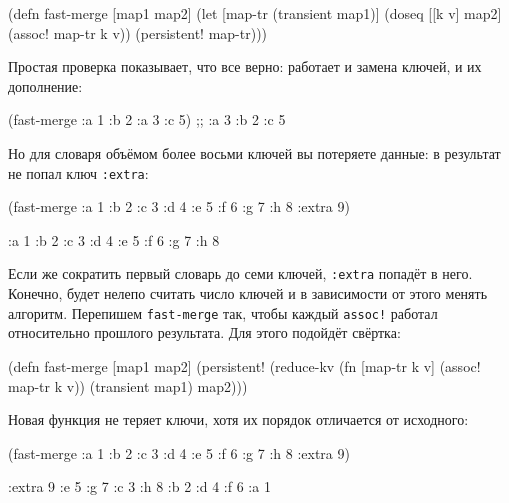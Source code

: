 \begin{english}
  \begin{clojure}
(defn fast-merge [map1 map2]
  (let [map-tr (transient map1)]
    (doseq [[k v] map2]
      (assoc! map-tr k v))
    (persistent! map-tr)))
  \end{clojure}
\end{english}

Простая проверка показывает, что все верно: работает и замена ключей, и их
дополнение:

\begin{english}
  \begin{clojure}
(fast-merge {:a 1 :b 2} {:a 3 :c 5})
;; {:a 3 :b 2 :c 5}
  \end{clojure}
\end{english}

Но для словаря объёмом более восьми ключей вы потеряете данные: в результат не
попал ключ \verb|:extra|:

\begin{english}
  \begin{clojure}
(fast-merge
 {:a 1 :b 2 :c 3 :d 4
  :e 5 :f 6 :g 7 :h 8}
 {:extra 9})

{:a 1 :b 2 :c 3 :d 4
 :e 5 :f 6 :g 7 :h 8}
  \end{clojure}
\end{english}

Если же сократить первый словарь до семи ключей, \verb|:extra| попадёт в
него. Конечно, будет нелепо считать число ключей и в зависимости от этого менять
алгоритм. Перепишем \verb|fast-merge| так, чтобы каждый \verb|assoc!| работал
относительно прошлого результата. Для этого подойдёт свёртка:

\begin{english}
  \begin{clojure}
(defn fast-merge [map1 map2]
  (persistent!
   (reduce-kv
    (fn [map-tr k v]
      (assoc! map-tr k v))
    (transient map1)
    map2)))
  \end{clojure}
\end{english}

Новая функция не теряет ключи, хотя их порядок отличается от исходного:

\begin{english}
  \begin{clojure}
(fast-merge
 {:a 1 :b 2 :c 3 :d 4
  :e 5 :f 6 :g 7 :h 8}
 {:extra 9})

{:extra 9 :e 5 :g 7 :c 3
 :h 8 :b 2 :d 4 :f 6 :a 1}
  \end{clojure}
\end{english}

